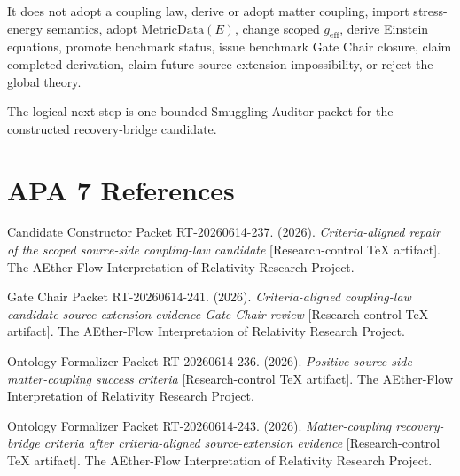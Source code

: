 \documentclass[11pt]{article}
\newcommand{\geff}{g_{\mathrm{eff}}}
\newcommand{\MetricData}{\mathrm{MetricData}}
\begin{document}
It does not adopt a coupling law, derive or adopt matter coupling, import
stress-energy semantics, adopt \(\MetricData(E)\), change scoped \(\geff\),
derive Einstein equations, promote benchmark status, issue benchmark Gate
Chair closure, claim completed derivation, claim future source-extension
impossibility, or reject the global theory.

The logical next step is one bounded Smuggling Auditor packet for the
constructed recovery-bridge candidate.

\section{APA 7 References}

Candidate Constructor Packet RT-20260614-237. (2026). \emph{Criteria-aligned
repair of the scoped source-side coupling-law candidate} [Research-control
TeX artifact]. The AEther-Flow Interpretation of Relativity Research Project.

Gate Chair Packet RT-20260614-241. (2026). \emph{Criteria-aligned
coupling-law candidate source-extension evidence Gate Chair review}
[Research-control TeX artifact]. The AEther-Flow Interpretation of Relativity
Research Project.

Ontology Formalizer Packet RT-20260614-236. (2026). \emph{Positive
source-side matter-coupling success criteria} [Research-control TeX artifact].
The AEther-Flow Interpretation of Relativity Research Project.

Ontology Formalizer Packet RT-20260614-243. (2026). \emph{Matter-coupling
recovery-bridge criteria after criteria-aligned source-extension evidence}
[Research-control TeX artifact]. The AEther-Flow Interpretation of Relativity
Research Project.
\end{document}
